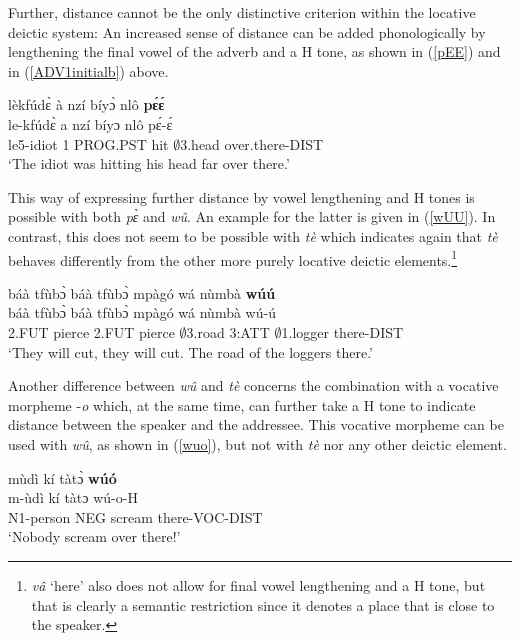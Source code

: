 Further, distance cannot be the only distinctive criterion within the locative deictic system: An increased sense of distance can be added phonologically by lengthening the final vowel of the adverb and a H tone, as shown in (\ref{pEE}) and in (\ref{ADV1initialb}) above.


\begin{exe} 
\ex\label{pEE}
  \glll     lèkfúdɛ̀ à nzí bíyɔ̀ nlô {\bfseries pɛ́ɛ́}  \\
	le-kfúdɛ̀ a nzí bíyɔ nlô pɛ́-ɛ́ \\
              le5-idiot 1 PROG.PST hit $\emptyset$3.head over.there-DIST  \\
    \trans `The idiot was hitting his head far over there.'
\end{exe}

\noindent This way of expressing further distance by vowel lengthening and H tones is possible with both {\itshape pɛ̀} and {\itshape wû}. An example for the latter is given in (\ref{wUU}). In contrast, this does not seem to be possible with {\itshape tè} which indicates again that {\itshape tè} behaves differently from the other more purely locative deictic elements.\footnote{{\itshape vâ} `here' also does not allow for final vowel lengthening and a H tone, but that is clearly a semantic restriction since it denotes a place that is close to the speaker.}

\begin{exe} 
\ex\label{wUU}
  \glll  báà tfùbɔ̀ báà tfùbɔ̀ mpàgó wá nùmbà {\bfseries wúú}\\
         báà tfùbɔ̀ báà tfùbɔ̀ mpàgó wá nùmbà wú-ú\\
          2.FUT pierce 2.FUT pierce $\emptyset$3.road 3:ATT $\emptyset$1.logger there-DIST \\
    \trans `They will cut, they will cut. The road of the loggers there.'
\end{exe}

Another difference between {\itshape wû} and {\itshape tè} concerns the combination with a vocative morpheme -{\itshape o} which, at the same time, can further take a H tone to indicate distance between the speaker and the addressee. This vocative morpheme can be used with {\itshape wû}, as shown in (\ref{wuo}), but not with {\itshape tè} nor any other deictic element.

\begin{exe} 
\ex\label{wuo} 
  \glll mùdì kí tàtɔ̀ {\bfseries wúó} \\
        m-ùdì kí tàtɔ wú-o-H \\
        N1-person NEG scream there-VOC-DIST \\
    \trans `Nobody scream over there!'
\end{exe}

